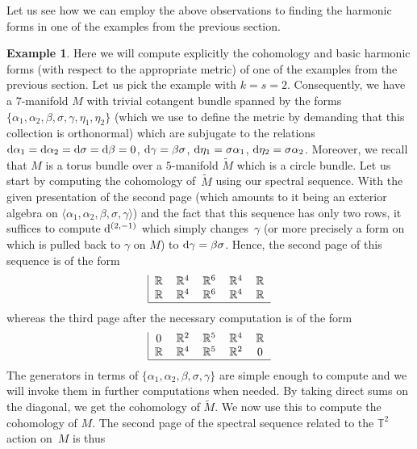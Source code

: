 \documentclass[pdftex]{sigma}
\numberwithin{equation}{section}
\theoremstyle{definition}
\newtheorem{egg}[tw]{Example}
\begin{document}
Let us see how we can employ the above observations to finding the harmonic forms in one of the examples from the previous section.
\begin{egg} Here we will compute explicitly the cohomology and basic harmonic forms (with respect to the appropriate metric) of one of the examples from the previous section. Let us pick the example with $k=s=2$. Consequently, we have a $7$-manifold $M$ with trivial cotangent bundle spanned by the forms $\{\alpha_1,\alpha_2,\beta,\sigma,\gamma,\eta_1,\eta_2\}$ (which we use to define the metric by demanding that this collection is orthonormal) which are subjugate to the relations
${\rm d}\alpha_1={\rm d}\alpha_2={\rm d}\sigma={\rm d}\beta=0$, ${\rm d}\gamma=\beta\sigma$,
${\rm d}\eta_1=\sigma\alpha_1$, ${\rm d}\eta_2=\sigma\alpha_2$.
Moreover, we recall that $M$ is a torus bundle over a $5$-manifold $\tilde{M}$ which is a circle bundle. Let us start by computing the cohomology of~$\tilde{M}$ using our spectral sequence. With the given presentation of the second page (which amounts to it being an exterior algebra on $\langle\alpha_1,\alpha_2,\beta,\sigma,\gamma\rangle$) and the fact that this sequence has only two rows, it suffices to compute ${\rm d}^{(2,-1)}$ which simply changes~$\gamma$ (or more precisely a form on~ which is pulled back to $\gamma$ on $M$) to ${\rm d}\gamma=\beta\sigma$. Hence, the second page of this sequence is of the form
\[\begin{tabular}{|c c c c c}
$\mathbb{R}$ & $\mathbb{R}^4$ & $\mathbb{R}^6$&$\mathbb{R}^4$& $\mathbb{R}$\\
$\mathbb{R}$ & $\mathbb{R}^4$ & $\mathbb{R}^6$&$\mathbb{R}^4$& $\mathbb{R}$
\\\hline
\end{tabular}\]
whereas the third page after the necessary computation is of the form
\[\begin{tabular}{|c c c c c}
$0$ & $\mathbb{R}^2$ & $\mathbb{R}^5$&$\mathbb{R}^4$& $\mathbb{R}$\\
$\mathbb{R}$ & $\mathbb{R}^4$ & $\mathbb{R}^5$&$\mathbb{R}^2$& $0$
\\\hline
\end{tabular}\]
The generators in terms of $\{\alpha_1,\alpha_2,\beta,\sigma,\gamma\}$ are simple enough to compute and we will invoke them in further computations when needed. By taking direct sums on the diagonal, we get the cohomology of $\tilde{M}$. We now use this to compute the cohomology of $M$. The second page of the spectral sequence related to the $\mathbb{T}^2$ action on~$M$ is thus

\end{egg}
\end{document}
